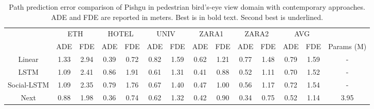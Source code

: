 \documentclass[sigconf]{acmart}
\begin{document}
\begin{table*}[!t] \caption{Path prediction error comparison of Pishgu in pedestrian bird's-eye view domain with contemporary approaches. ADE and FDE are reported in meters. Best is in bold text. Second best is
underlined.}
\vspace{-8pt}
\label{tab:human_bird}
\renewcommand{\arraystretch}{1.3}
\centering
\begin{adjustbox}{max width = \linewidth,center}
\begin{tabular}{c||cc||cc||cc||cc||cc||cc||c}
\rowcolor{DarkGray}
                                  & \multicolumn{2}{|c||}{ETH}                  & \multicolumn{2}{c||}{HOTEL}                & \multicolumn{2}{c||}{UNIV}                 & \multicolumn{2}{c||}{ZARA1}                & \multicolumn{2}{c||}{ZARA2}                & \multicolumn{2}{c||}{AVG}      &             \\ \cline{2-14}
                                  \rowcolor{Gray}
                                  & \multicolumn{1}{|c|}{ADE}  & FDE  & \multicolumn{1}{c|}{ADE}  & FDE  & \multicolumn{1}{c|}{ADE}  & FDE  & \multicolumn{1}{c|}{ADE}  & FDE  & \multicolumn{1}{c|}{ADE}  & FDE  & \multicolumn{1}{c|}{ADE}  & FDE & Params (M) \\ \hline \hline
\multicolumn{1}{c||}{Linear}       & \multicolumn{1}{c|}{1.33}          & 2.94          & \multicolumn{1}{c|}{0.39}          & 0.72          & \multicolumn{1}{c|}{0.82}          & 1.59          & \multicolumn{1}{c|}{0.62}          & 1.21          & \multicolumn{1}{c|}{0.77}          & 1.48          & \multicolumn{1}{c|}{0.79}          & 1.59     & -     \\ \hline
\multicolumn{1}{c||}{LSTM}         & \multicolumn{1}{c|}{1.09}          & 2.41          & \multicolumn{1}{c|}{0.86}          & 1.91          & \multicolumn{1}{c|}{0.61}          & 1.31          & \multicolumn{1}{c|}{0.41}          & 0.88          & \multicolumn{1}{c|}{0.52}          & 1.11          & \multicolumn{1}{c|}{0.70}           & 1.52     & -     \\ \hline
\multicolumn{1}{c||}{Social-LSTM \cite{alahi2016social}} & \multicolumn{1}{c|}{1.09}          & 2.35          & \multicolumn{1}{c|}{0.79}          & 1.76          & \multicolumn{1}{c|}{0.67}          & 1.40           & \multicolumn{1}{c|}{0.47}          & 1.00             & \multicolumn{1}{c|}{0.56}          & 1.17          & \multicolumn{1}{c|}{0.72}          & 1.54     & -     \\ \hline
\multicolumn{1}{c||}{Next \cite{liang2019peeking}}         & \multicolumn{1}{c|}{0.88}          & 1.98          & \multicolumn{1}{c|}{{0.36}}          & {0.74}          & \multicolumn{1}{c|}{0.62}          & 1.32          & \multicolumn{1}{c|}{0.42}          & 0.90           & \multicolumn{1}{c|}{0.34}          & 0.75          & \multicolumn{1}{c|}{{0.52}}          & 1.14   & 3.95       \\ \hline

\end{tabular}
\end{adjustbox}
\end{table*}
\end{document}
